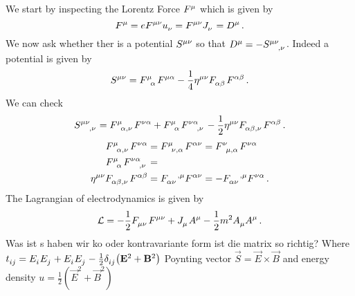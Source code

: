 \begin{example}[Electrodynamics]
We start by inspecting the Lorentz Force $\tensor{F}{^\mu}$ which is given by
\begin{equation}
    \tensor{F}{^\mu}=e\tensor{F}{^\mu^\nu}\tensor{u}{_\nu}=\tensor{F}{^\mu^\nu}\tensor{J}{_\nu}=\tensor{D}{^\mu}\,
    .
\end{equation}
We now ask whether ther is a potential $\tensor{S}{^\mu^\nu}$ so that
$\tensor{D}{^\mu}=-\tensor{S}{^\mu^\nu_{,\nu}}$. Indeed a potential is given by
\begin{equation}
    \tensor{S}{^\mu^\nu}=\tensor{F}{^\mu_\alpha}\tensor{F}{^\mu^\alpha}-\frac{1}{4}\tensor{\eta}{^\mu^\nu}\tensor{F}{_\alpha_\beta}\tensor{F}{^\alpha^\beta}\,
    .
\end{equation}
We can check
\begin{equation}
    \tensor{S}{^\mu^\nu_{,\nu}}=\tensor{F}{^\mu_\alpha_{,\nu}}\tensor{F}{^\nu^\alpha}+
    \tensor{F}{^\mu_\alpha}\tensor{F}{^\nu^\alpha_{,\nu}}
    -\frac{1}{2}\tensor{\eta}{^\mu^\nu}\tensor{F}{_\alpha_\beta_{,\nu}}\tensor{F}{^\alpha^\beta}\,
    .
\end{equation}
\begin{align}
    \tensor{F}{^\mu_\alpha_{,\nu}}\tensor{F}{^\nu^\alpha}
    &=\tensor{F}{^\mu_\nu_{,\alpha}}\tensor{F}{^\alpha^\nu}
    =\tensor{F}{^\nu_\mu_{,\alpha}}\tensor{F}{^\nu^\alpha}
    \\
    \tensor{F}{^\mu_\alpha}\tensor{F}{^\nu^\alpha_{,\nu}}&=\\
    \tensor{\eta}{^\mu^\nu}\tensor{F}{_\alpha_\beta_{,\nu}}\tensor{F}{^\alpha^\beta}
    &=\tensor{F}{_\alpha_\nu^{,\mu}}\tensor{F}{^\alpha^\nu}
    = -\tensor{F}{_\alpha_\nu^{,\mu}}\tensor{F}{^\nu^\alpha}
    \,
    .
\end{align}
The Lagrangian of electrodynamics is given by
\begin{equation}
    \mathcal{L}=-\frac{1}{2}\tensor{F}{_\mu_\nu}\tensor{F}{^\mu^\nu}+\tensor{J}{_\mu}\tensor{A}{^\mu}-\frac{1}{2}m^2\tensor{A}{_\mu}\tensor{A}{^\mu}\,
    .
\end{equation}
Was ist s haben wir ko oder kontravariante form ist die matrix so richtig?
Where
$\tensor{t}{_i_j}=\tensor{E}{_i}\tensor{E}{_j}+\tensor{E}{_i}\tensor{E}{_j}-\frac{1}{2}\tensor{\delta}{_i_j}\left(\vec{E}^2+\vec{B}^2\right)$
Poynting vector $\vec{S}=\vec{E}\times\vec{B}$ and energy density $u
=\frac{1}{2}\left(\vec{E}^2+\vec{B}^2\right)$
\end{example}
